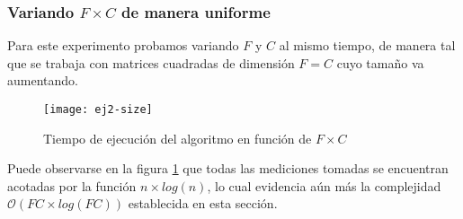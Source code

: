 \subsubsection{Variando $F \times C$ de manera uniforme}

Para este experimento probamos variando $F$ y $C$ al mismo tiempo, de manera tal que se trabaja con matrices cuadradas de dimensión $F = C$ cuyo tamaño va aumentando.

\begin{figure}[H]
	\centering
	\texttt{[image: ej2-size]}
	\caption{Tiempo de ejecución del algoritmo en función de $F \times C$}
	\label{fig:ej2-size-fig}
\end{figure}

Puede observarse en la figura \ref{fig:ej2-size-fig} que todas las mediciones tomadas se encuentran acotadas por la función $n \times log(n)$, lo cual evidencia aún más la complejidad $\mathcal{O}(FC \times log(FC))$ establecida en esta sección.
